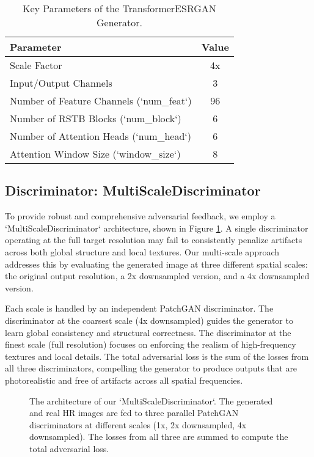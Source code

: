 \documentclass{article}
\begin{document}
\begin{table}[h!]
\centering
\caption{Key Parameters of the TransformerESRGAN Generator.}
\label{tab:generator_params}
\begin{tabular}{@{}lc@{}}
\toprule
Parameter                   & Value \\ \midrule
Scale Factor                & 4x    \\
Input/Output Channels       & 3     \\
Number of Feature Channels (`num_feat`) & 96    \\
Number of RSTB Blocks (`num_block`)   & 6     \\
Number of Attention Heads (`num_head`)  & 6     \\
Attention Window Size (`window_size`) & 8     \\ \bottomrule
\end{tabular}
\end{table}

\subsection{Discriminator: MultiScaleDiscriminator}

To provide robust and comprehensive adversarial feedback, we employ a `MultiScaleDiscriminator` architecture, shown in Figure \ref{fig:discriminator_arch}. A single discriminator operating at the full target resolution may fail to consistently penalize artifacts across both global structure and local textures. Our multi-scale approach addresses this by evaluating the generated image at three different spatial scales: the original output resolution, a 2x downsampled version, and a 4x downsampled version.

Each scale is handled by an independent PatchGAN discriminator. The discriminator at the coarsest scale (4x downsampled) guides the generator to learn global consistency and structural correctness. The discriminator at the finest scale (full resolution) focuses on enforcing the realism of high-frequency textures and local details. The total adversarial loss is the sum of the losses from all three discriminators, compelling the generator to produce outputs that are photorealistic and free of artifacts across all spatial frequencies.

\begin{figure}[h!]
\centering
\caption{The architecture of our `MultiScaleDiscriminator`. The generated and real HR images are fed to three parallel PatchGAN discriminators at different scales (1x, 2x downsampled, 4x downsampled). The losses from all three are summed to compute the total adversarial loss.}
\label{fig:discriminator_arch}
\end{figure}
\end{document}
